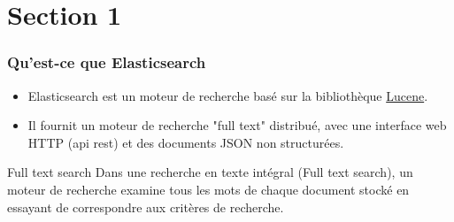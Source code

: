 \section{Section 1}\label{sec:section-1}
\begin{frame}
    \frametitle{Qu'est-ce que Elasticsearch}

    \begin{itemize}
        \item Elasticsearch est un moteur de recherche basé sur la bibliothèque \href{https://en.wikipedia.org/wiki/Lucene}{Lucene}\autocite{wiki_elastic}.
        \item Il fournit un moteur de recherche "full text" distribué, avec une interface web HTTP (api rest) et des documents JSON non structurées\autocite{wiki_elastic}.
    \end{itemize}

    \begin{block}{Full text search}
        Dans une recherche en texte intégral (Full text search), un moteur de recherche examine tous les mots de chaque document stocké en essayant de correspondre aux critères de recherche\autocite{wiki_fulltextsearch}.
    \end{block}
\end{frame}
